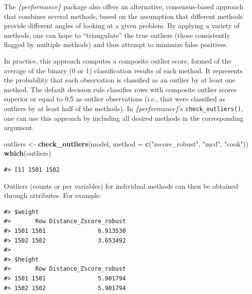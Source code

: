 \documentclass{article}
\newenvironment{Shaded}{\begin{snugshade}}{\end{snugshade}}
\newcommand{\AttributeTok}[1]{\textcolor[rgb]{0.13,0.29,0.53}{#1}}
\newcommand{\FunctionTok}[1]{\textcolor[rgb]{0.13,0.29,0.53}{\textbf{#1}}}
\newcommand{\NormalTok}[1]{#1}
\newcommand{\OtherTok}[1]{\textcolor[rgb]{0.56,0.35,0.01}{#1}}
\newcommand{\SpecialCharTok}[1]{\textcolor[rgb]{0.81,0.36,0.00}{\textbf{#1}}}
\newcommand{\StringTok}[1]{\textcolor[rgb]{0.31,0.60,0.02}{#1}}
\begin{document}
The \emph{\{performance\}} package also offers an alternative,
consensus-based approach that combines several methods, based on the
assumption that different methods provide different angles of looking at
a given problem. By applying a variety of methods, one can hope to
``triangulate'' the true outliers (those consistently flagged by
multiple methods) and thus attempt to minimize false positives.

In practice, this approach computes a composite outlier score, formed of
the average of the binary (0 or 1) classification results of each
method. It represents the probability that each observation is
classified as an outlier by at least one method. The default decision
rule classifies rows with composite outlier scores superior or equal to
0.5 as outlier observations (i.e., that were classified as outliers by
at least half of the methods). In \emph{\{performance\}}'s
\texttt{check\_outliers()}, one can use this approach by including all
desired methods in the corresponding argument.

\begin{Shaded}
\begin{Highlighting}[]
\NormalTok{outliers }\OtherTok{\textless{}{-}} \FunctionTok{check\_outliers}\NormalTok{(model, }\AttributeTok{method =} \FunctionTok{c}\NormalTok{(}\StringTok{"zscore\_robust"}\NormalTok{, }\StringTok{"mcd"}\NormalTok{, }\StringTok{"cook"}\NormalTok{))}
\FunctionTok{which}\NormalTok{(outliers)}
\end{Highlighting}
\end{Shaded}

\begin{verbatim}
#> [1] 1501 1502
\end{verbatim}

Outliers (counts or per variables) for individual methods can then be
obtained through attributes. For example:

\begin{Shaded}
\end{Shaded}

\begin{verbatim}
#> $weight
#>       Row Distance_Zscore_robust
#> 1501 1501               6.913530
#> 1502 1502               3.653492
#> 
#> $height
#>       Row Distance_Zscore_robust
#> 1501 1501               5.901794
#> 1502 1502               5.901794
\end{verbatim}
\end{document}

